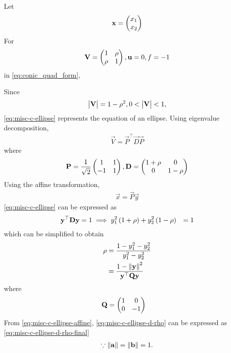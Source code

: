\documentclass[journal,12pt,onecolumn]{IEEEtran}
\renewcommand\thesection{\arabic{section}}
\begin{document}
\begin{enumerate}[label=\thesection.\arabic*.,ref=\thesection.\theenumi]
		\solution Let 
		\begin{align}
			\mathbf{x} = \begin{pmatrix}x_1 \\ x_2\end{pmatrix}
		\end{align}
For 
	  \begin{align}
		  \mathbf{V} = \begin{pmatrix}1 & \rho \\ \rho & 1\end{pmatrix}, \mathbf{u} = 0, f = -1
	  \end{align}
	  in 
  \eqref{eq:conic_quad_form}, 

		Since
		\begin{align}
			\begin{vmatrix}\mathbf{V}\end{vmatrix} = 1-\rho^2, 
			0 < \begin{vmatrix}\mathbf{V}\end{vmatrix} < 1,
		\end{align}
\eqref{eq:misc-c-ellipse}
		represents the equation of an ellipse.
		Using eigenvalue decomposition, 
		\begin{align}
			\vec{V} = \vec{P}^{\top}\vec{D}\vec{P}
		\end{align}
		where 
		\begin{align}
			\mathbf{P} = \frac{1}{\sqrt{2}}\begin{pmatrix}1 & 1 \\ -1 & 1\end{pmatrix},
			\mathbf{D} = \begin{pmatrix}1+\rho & 0 \\ 0 & 1-\rho\end{pmatrix}
		\end{align}
		Using the affine transformation, 
		\begin{align}
			\vec{x} = 
			\vec{P}\vec{y}
			\label{eq:misc-c-ellipse-affine}
		\end{align}
			\eqref{eq:misc-c-ellipse}
			can be expressed as 
		\begin{align}
			\mathbf{y}^{\top}\mathbf{D}\mathbf{y} &= 1
			\label{eq:misc-c-ellipse-d}
			\implies y_1^2\left(1+\rho\right) + y_2^2\left(1-\rho\right) &= 1
		\end{align}
		which can be simplified to obtain 
		\begin{align}
			\rho &= \frac{1 - y_1^2 -  y_2^2}{y_1^2 -  y_2^2}
			\\
			&= \frac{1 - \left\lVert\mathbf{y}\right\rVert^2}{\mathbf{y}^{\top}\mathbf{Q}\mathbf{y}}
			\label{eq:misc-c-ellipse-d-rho}
		\end{align}
		where 
		\begin{align}
			\mathbf{Q}	&= \begin{pmatrix}1 & 0 \\ 0 & -1\end{pmatrix}
		\end{align}
			From \eqref{eq:misc-c-ellipse-affine}, 
			\eqref{eq:misc-c-ellipse-d-rho} can be expressed as 
			\eqref{eq:misc-c-ellipse-d-rho-final}
		\begin{align}
\because \left\lVert\mathbf{a}\right\rVert = \left\lVert\mathbf{b}\right\rVert = 1.
		\end{align}


\end{enumerate}
\end{document}
